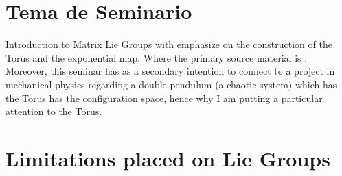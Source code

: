 \begin{assignment}[
  header=HeaderA,
  body=BodyA,
  title={Guia de Projecto},
  duedate={\today},
  toc=false,
  toctitle={},
  exlist=false
]


\section*{Tema de Seminario}
Introduction to Matrix Lie Groups with emphasize on the construction of the Torus and the exponential map. Where the primary source material is \textcite{hall2015lie}. Moreover, this seminar has as a secondary intention to connect to a project in mechanical physics regarding a double pendulum (a chaotic system) which has the Torus has the configuration space, hence why I am putting a particular attention to the Torus.

\section*{Limitations placed on Lie Groups}


\end{assignment}
